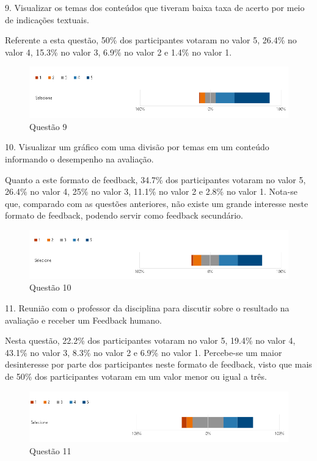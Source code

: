 9. Visualizar os temas dos conteúdos que tiveram baixa taxa de acerto por meio de indicações textuais.

Referente a esta questão, 50\% dos participantes votaram no valor 5, 26.4\% no valor 4, 15.3\% no valor 3, 6.9\% no valor 2 e 1.4\% no valor 1.

\begin{figure}[H]
\centering
\includegraphics[scale=0.6]{figuras/9.png}
\caption{Questão 9}
\end{figure}

10. Visualizar um gráfico com uma divisão por temas em um conteúdo informando o desempenho na avaliação.

Quanto a este formato de feedback, 34.7\% dos participantes votaram no valor 5, 26.4\% no valor 4, 25\% no valor 3, 11.1\% no valor 2 e 2.8\% no valor 1. Nota-se que, comparado com as questões anteriores, não existe um grande interesse neste formato de feedback, podendo servir como feedback secundário.

\begin{figure}[H]
\centering
\includegraphics[scale=0.6]{figuras/10.png}
\caption{Questão 10}
\end{figure}

11. Reunião com o professor da disciplina para discutir sobre o resultado na avaliação e receber um Feedback humano.

Nesta questão, 22.2\% dos participantes votaram no valor 5, 19.4\% no valor 4, 43.1\% no valor 3, 8.3\% no valor 2 e 6.9\% no valor 1. Percebe-se um maior desinteresse por parte dos participantes neste formato de feedback, visto que mais de 50\% dos participantes votaram em um valor menor ou igual a três.

\begin{figure}[H]
\centering
\includegraphics[scale=0.6]{figuras/11.png}
\caption{Questão 11}
\end{figure}

